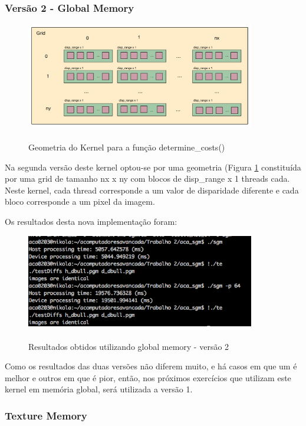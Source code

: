 \documentclass[pdftex,12pt,a4paper]{report}
\begin{document}
\subsubsection{Versão 2 - Global Memory}

\begin{figure}[!htb]
\center
 \includegraphics[width=100mm,scale=1]{DetermineCosts_v2_kernel.pdf}
 \caption{\\ Geometria do Kernel para a função determine\_costs()}
 \label{fig:DetermineCosts_v2_kernel}
\end{figure}

Na segunda versão deste kernel optou-se por uma geometria (Figura \ref{fig:DetermineCosts_v2_kernel}  constituída por uma grid de tamanho nx x ny com blocos de disp\_range x 1 threads cada.
Neste kernel, cada thread corresponde a um valor de disparidade diferente e cada bloco corresponde a um pixel da imagem.

Os resultados desta nova implementação foram:

\begin{figure}[!htb]
\center
 \includegraphics[width=100mm,scale=1]{DetermineCostsv2.png}
 \caption{\\ Resultados obtidos utilizando global memory - versão 2}
 \label{fig:DetermineCostsv2}
\end{figure}

Como os resultados das duas versões não diferem muito, e há casos em que um é melhor e outros em que é pior, então, nos próximos exercícios que utilizam este kernel em memória global, será utilizada a versão 1.

\subsubsection{Texture Memory}
\end{document}
